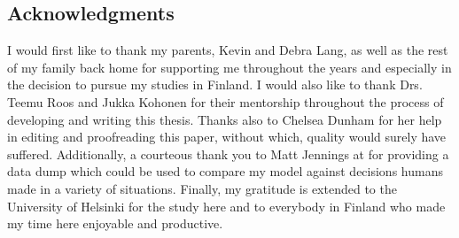 \vspace*{\fill}
\begin{centering}

\section*{Acknowledgments}
\label{sec:thanks}

\end{centering}


I would first like to thank my parents, Kevin and Debra Lang,
as well as the rest of my family back home
for supporting me
throughout the years and especially in the decision to pursue my studies
in Finland.
%
I would also
like to thank Drs. Teemu Roos
and Jukka Kohonen
for %
their mentorship throughout the
process of developing and writing this thesis.
%
Thanks also to Chelsea Dunham for her help in editing and proofreading
this paper,
without which,
quality would surely have suffered.
%
Additionally,
a courteous thank you to Matt Jennings at
 for providing a data dump
which could be used to compare my model against decisions humans made
in a variety of situations.
%
Finally, my gratitude is extended to the University of Helsinki for the
study here
and to everybody in Finland who made my time here enjoyable and productive.


\vspace*{\fill}
\vspace*{\fill}
\newpage
